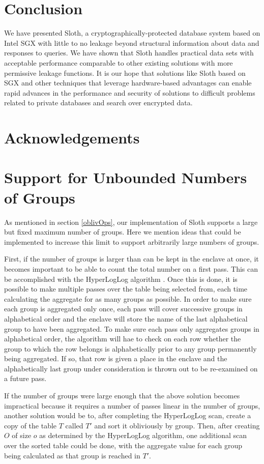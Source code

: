 \documentclass[USenglish,oneside,twocolumn]{article}
\def\name/{Sloth}
\begin{document}
\section{Conclusion}\label{conclusion}
We have presented \name/, a cryptographically-protected database system based on Intel SGX with little to no leakage beyond structural information about data and responses to queries. We have shown that \name/ handles practical data sets with acceptable performance comparable to other existing solutions with more permissive leakage functions. It is our hope that solutions like \name/ based on SGX and other techniques that leverage hardware-based advantages can enable rapid advances in the performance and security of solutions to difficult problems related to private databases and search over encrypted data. 

\section*{Acknowledgements}






\appendix

\section{Support for Unbounded Numbers of Groups}\label{groupby}
As mentioned in section \ref{oblivOps}, our implementation of \name/ supports a large but fixed maximum number of groups. Here we mention ideas that could be implemented to increase this limit to support arbitrarily large numbers of groups. 

First, if the number of groups is larger than can be kept in the enclave at once, it becomes important to be able to count the total number on a first pass. This can be accomplished with the HyperLogLog algorithm \cite{FFGM07}. Once this is done, it is possible to make multiple passes over the table being selected from, each time calculating the aggregate for as many groups as possible. In order to make sure each group is aggregated only once, each pass will cover successive groups in alphabetical order and the enclave will store the name of the last alphabetical group to have been aggregated. To make sure each pass only aggregates groups in alphabetical order, the algorithm will hae to check on each row whether the group to which the row belongs is alphabetically prior to any group permanently being aggregated. If so, that row is given a place in the enclave and the alphabetically last group under consideration is thrown out to be re-examined on a future pass. 

If the number of groups were large enough that the above solution becomes impractical because it requires a number of passes linear in the number of groups, another solution would be to, after completing the HyperLogLog scan, create a copy of the table $T$ called $T'$ and sort it obliviously by group. Then, after creating $O$ of size $o$ as determined by the HyperLogLog algorithm, one additional scan over the sorted table could be done, with the aggregate value for each group being calculated as that group is reached in $T'$. 
\end{document}

